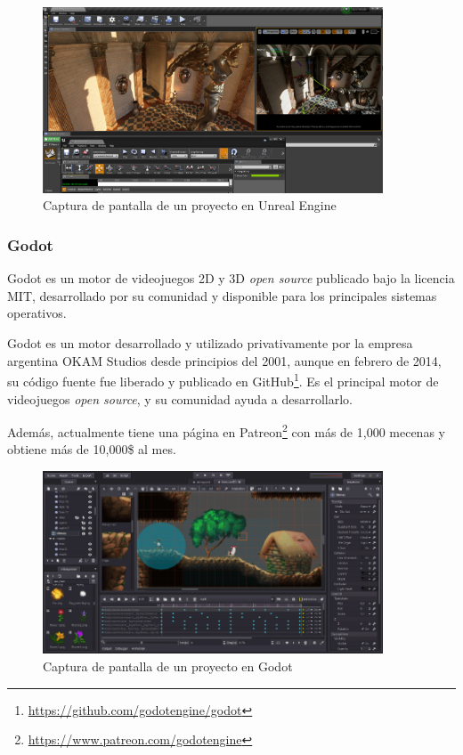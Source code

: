 \begin{figure}[!h]
\begin{center}
\includegraphics[width=0.9\textwidth]{imagenes/2/unreal-engine-4.jpg}
\caption{Captura de pantalla de un proyecto en Unreal Engine}
\label{fig:unreal}
\end{center}
\end{figure}

\subsubsection{Godot}

Godot es un motor de videojuegos 2D y 3D \textit{open source} publicado bajo la licencia \acs{MIT}, desarrollado por su comunidad y disponible para los principales sistemas operativos.

Godot es un motor desarrollado y utilizado privativamente por la empresa argentina OKAM Studios desde principios del 2001, aunque en febrero de 2014, su código fuente fue liberado y publicado en GitHub\footnote{\url{https://github.com/godotengine/godot}}. Es el principal motor de videojuegos \textit{open source}, y su comunidad ayuda a desarrollarlo. 

Además, actualmente tiene una página en Patreon\footnote{\url{https://www.patreon.com/godotengine}} con más de 1,000 mecenas y obtiene más de 10,000\$ al mes.

\begin{figure}[!h]
\begin{center}
\includegraphics[width=0.9\textwidth]{imagenes/2/godot.jpg}
\caption{Captura de pantalla de un proyecto en Godot}
\label{fig:godot}
\end{center}
\end{figure}


